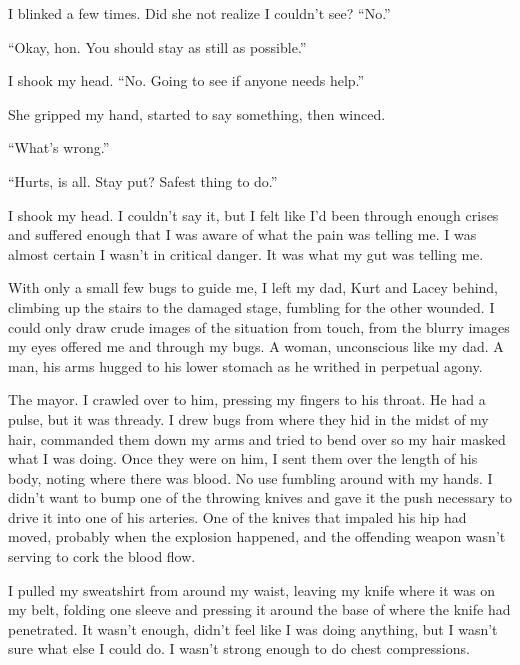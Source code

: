 I blinked a few times.  Did she not realize I couldn't see?  ``No.''



``Okay, hon.  You should stay as still as possible.''



I shook my head.  ``No.  Going to see if anyone needs help.''



She gripped my hand, started to say something, then winced.



``What's wrong.''



``Hurts, is all.  Stay put?  Safest thing to do.''



I shook my head.  I couldn't say it, but I felt like I'd been through enough crises and suffered enough that I was aware of what the pain was telling me.  I was almost certain I wasn't in critical danger.  It was what my gut was telling me.



With only a small few bugs to guide me, I left my dad, Kurt and Lacey behind, climbing up the stairs to the damaged stage, fumbling for the other wounded.  I could only draw crude images of the situation from touch, from the blurry images my eyes offered me and through my bugs.  A woman, unconscious like my dad.  A man, his arms hugged to his lower stomach as he writhed in perpetual agony.



The mayor.  I crawled over to him, pressing my fingers to his throat.  He had a pulse, but it was thready.  I drew bugs from where they hid in the midst of my hair, commanded them down my arms and tried to bend over so my hair masked what I was doing.  Once they were on him, I sent them over the length of his body, noting where there was blood.  No use fumbling around with my hands.  I didn't want to bump one of the throwing knives and gave it the push necessary to drive it into one of his arteries.  One of the knives that impaled his hip had moved, probably when the explosion happened, and the offending weapon wasn't serving to cork the blood flow.



I pulled my sweatshirt from around my waist, leaving my knife where it was on my belt, folding one sleeve and pressing it around the base of where the knife had penetrated.  It wasn't enough, didn't feel like I was doing anything, but I wasn't sure what else I could do.  I wasn't strong enough to do chest compressions.



